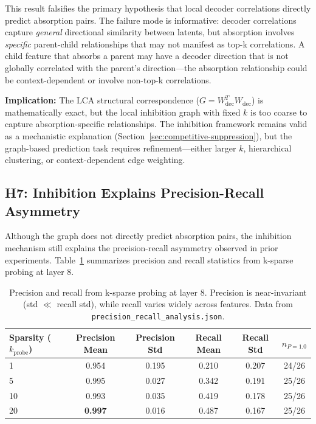 \documentclass{article}
\begin{document}
This result falsifies the primary hypothesis that local decoder correlations directly predict absorption pairs. The failure mode is informative: decoder correlations capture \textit{general} directional similarity between latents, but absorption involves \textit{specific} parent-child relationships that may not manifest as top-k correlations. A child feature that absorbs a parent may have a decoder direction that is not globally correlated with the parent's direction---the absorption relationship could be context-dependent or involve non-top-k correlations.

\textbf{Implication:} The LCA structural correspondence ($G = W_{\text{dec}}^T W_{\text{dec}}$) is mathematically exact, but the local inhibition graph with fixed $k$ is too coarse to capture absorption-specific relationships. The inhibition framework remains valid as a mechanistic explanation (Section~\ref{sec:competitive-suppression}), but the graph-based prediction task requires refinement---either larger $k$, hierarchical clustering, or context-dependent edge weighting.

\subsection{H7: Inhibition Explains Precision-Recall Asymmetry}
\label{sec:h7}

Although the graph does not directly predict absorption pairs, the inhibition mechanism still explains the precision-recall asymmetry observed in prior experiments. Table~\ref{tab:precision-recall} summarizes precision and recall statistics from k-sparse probing at layer 8.

\begin{table}[t]
\centering
\caption{Precision and recall from k-sparse probing at layer 8. Precision is near-invariant (std $\ll$ recall std), while recall varies widely across features. Data from \texttt{precision\_recall\_analysis.json}.}
\label{tab:precision-recall}
\begin{tabular}{lccccc}
\toprule
Sparsity ($k_{\text{probe}}$) & Precision Mean & Precision Std & Recall Mean & Recall Std & $n_{P=1.0}$ \\
\midrule
1 & 0.954 & 0.195 & 0.210 & 0.207 & 24/26 \\
5 & 0.995 & 0.027 & 0.342 & 0.191 & 25/26 \\
10 & 0.993 & 0.035 & 0.419 & 0.178 & 25/26 \\
20 & \textbf{0.997} & 0.016 & 0.487 & 0.167 & 25/26 \\
\bottomrule
\end{tabular}
\end{table}
\end{document}
